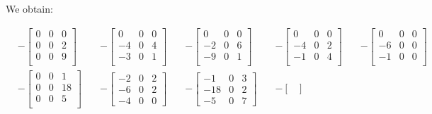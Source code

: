 \documentclass{article}
\begin{document}
We obtain:

\[
	\begin{aligned}
		 & -\begin{bmatrix}
			    0 & 0 & 0 \\
			    0 & 0 & 2 \\
			    0 & 0 & 9 \\
		    \end{bmatrix}
		\quad
		 & -\begin{bmatrix}
			    0  & 0 & 0 \\
			    -4 & 0 & 4 \\
			    -3 & 0 & 1 \\
		    \end{bmatrix}
		\quad
		 & -\begin{bmatrix}
			    0  & 0 & 0 \\
			    -2 & 0 & 6 \\
			    -9 & 0 & 1 \\
		    \end{bmatrix}
		\quad
		 & -\begin{bmatrix}
			    0  & 0 & 0 \\
			    -4 & 0 & 2 \\
			    -1 & 0 & 4 \\
		    \end{bmatrix}
		\quad
		 & -\begin{bmatrix}
			    0  & 0 & 0 \\
			    -6 & 0 & 0 \\
			    -1 & 0 & 0 \\
		    \end{bmatrix}
		\\
		 & -\begin{bmatrix}
			    0 & 0 & 1  \\
			    0 & 0 & 18 \\
			    0 & 0 & 5  \\
		    \end{bmatrix}
		\quad
		 & -\begin{bmatrix}
			    -2 & 0 & 2 \\
			    -6 & 0 & 2 \\
			    -4 & 0 & 0
		    \end{bmatrix}
		\quad
		 & -\begin{bmatrix}
			    -1  & 0 & 3 \\
			    -18 & 0 & 2 \\
			    -5  & 0 & 7
		    \end{bmatrix}
		\quad
		 & -\begin{bmatrix}

\end{bmatrix}
\end{aligned}\]
\end{document}
